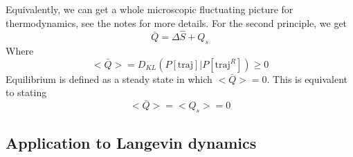 \documentclass[a4paper]{book}
\theoremstyle{definition}
\theoremstyle{remark}
\begin{document}
Equivalently, we can get a whole microscopic fluctuating picture for thermodynamics, see the notes for more details. For the second principle, we get 
\begin{equation}
    \bar{Q} = \Delta \hat{S} + Q_s
\end{equation}
Where 
\begin{equation}
    <\bar{Q}> = D_{KL}(P[\text{traj}]|P[\text{traj}^R]) \geq 0
\end{equation}
Equilibrium is defined as a steady state in which $<\bar{Q}> = 0$. This is equivalent to stating 
\begin{equation}
    <\bar{Q}> = <Q_s> = 0
\end{equation}

\subsection{Application to Langevin dynamics}
\end{document}

